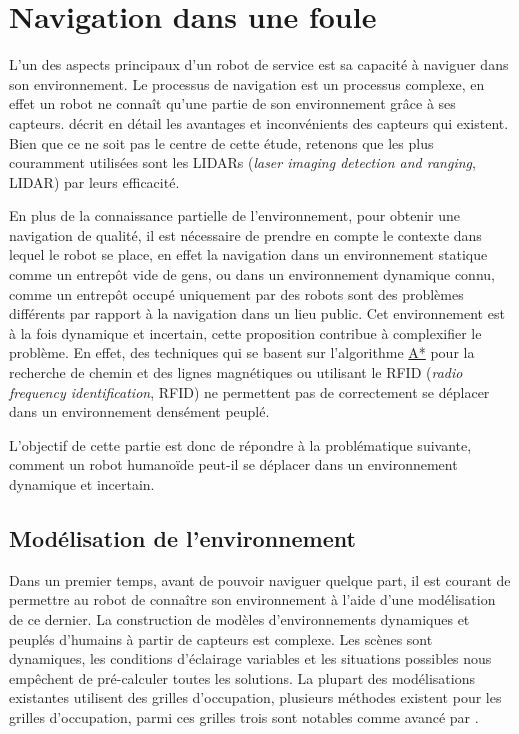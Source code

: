 \section[Navigation]{Navigation dans une foule}


L'un des aspects principaux d'un robot de service est sa capacité à naviguer dans son environnement. Le processus de navigation est un processus complexe, en effet un robot ne connaît qu'une partie de son environnement grâce à ses capteurs. \cite{lobo_sensors_2006} décrit en détail les avantages et inconvénients des capteurs qui existent. Bien que ce ne soit pas le centre de cette étude, retenons que les plus couramment utilisées sont les LIDARs (\textit{laser imaging detection and ranging}, LIDAR) par leurs efficacité.

En plus de la connaissance partielle de l'environnement, pour obtenir une navigation de qualité, il est nécessaire de prendre en compte le contexte dans lequel le robot se place, en effet la navigation dans un environnement statique comme un entrepôt vide de gens, ou dans un environnement dynamique connu, comme un entrepôt occupé uniquement par des robots sont des problèmes différents par rapport à la navigation dans un lieu public. Cet environnement est à la fois dynamique et incertain, cette proposition contribue à complexifier le problème. En effet, des techniques qui se basent sur l'algorithme \href{https://fr.wikipedia.org/wiki/Algorithme_A*#:~:text=En\%20informatique\%2C\%20plus\%20pr\%C3\%A9cis\%C3\%A9ment\%20en,n\%C5\%93ud\%20final\%20tous\%20deux\%20donn\%C3\%A9s.}{A*} pour la recherche de chemin et des lignes magnétiques ou utilisant le RFID (\textit{radio frequency identification}, RFID) \cite{xiao-long_robot_2017} ne permettent pas de correctement se déplacer dans un environnement densément peuplé.

L'objectif de cette partie est donc de répondre à la problématique suivante, comment un robot humanoïde peut-il se déplacer dans un environnement dynamique et incertain.

\subsection{Modélisation de l'environnement}
\label{subsec:modelisation}

Dans un premier temps, avant de pouvoir naviguer quelque part, il est courant de permettre au robot de connaître son environnement à l'aide d'une modélisation de ce dernier. La construction de modèles d'environnements dynamiques et peuplés d'humains à partir de capteurs est complexe. Les scènes sont dynamiques, les conditions d'éclairage variables et les situations possibles nous empêchent de pré-calculer toutes les solutions. La plupart des modélisations existantes utilisent des grilles d'occupation, plusieurs méthodes existent pour les grilles d'occupation, parmi ces grilles trois sont notables comme avancé par \cite{moras_grilles_nodate}. 

